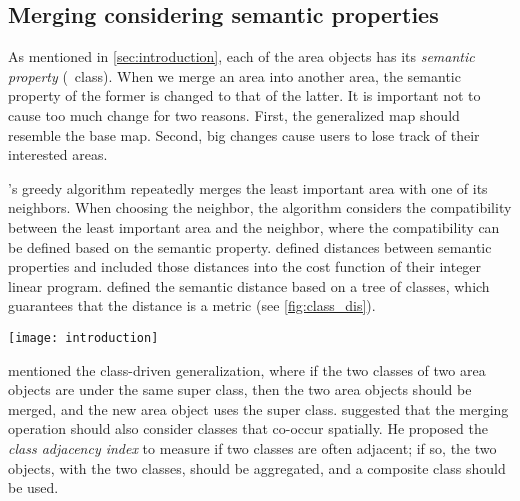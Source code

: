 \documentclass[twocolumn]{svjour3}          %
\begin{document}







\subsection{Merging considering semantic properties}

As mentioned in \sect\ref{sec:introduction}, 
each of the area objects has its \emph{semantic property} (\ie~class).
When we merge an area into another area, 
the semantic property of the former is changed to that of the latter.
It is important not to cause too much change for two reasons.
First, the generalized map should resemble the base map.
Second, big changes cause users to lose track of their interested areas.

's greedy algorithm repeatedly merges 
the least important area with one of its neighbors.
When choosing the neighbor, the algorithm considers 
the compatibility between the least important area and the neighbor,
where the compatibility can be defined based on the semantic property.
\citet{HaunertWolff2010AreaAgg} defined distances between semantic properties 
and included those distances into the cost function of their integer linear program.
\citet{Peng2020AreaAgg} defined the semantic distance based on a tree of classes,
which guarantees that the distance is a metric (see \fig\ref{fig:class_dis}).   


\begin{figure*}[tb]
\centering
\texttt{[image: introduction]}
\caption{A way of defining the distance of classes;
taken from \citet{Peng2020AreaAgg}.}
\label{fig:class_dis}
\end{figure*}

 mentioned the class-driven generalization, 
where if the two classes of two area objects are under the same super class,
then the two area objects should be merged, 
and the new area object uses the super class.
 suggested that
the merging operation should also consider classes that co-occur spatially.
He proposed the \emph{class adjacency index} to measure 
if two classes are often adjacent;
if so, the two objects, with the two classes, should be aggregated,
and a composite class should be used.
\end{document}
